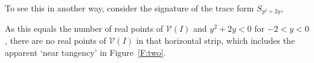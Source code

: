 \documentclass[12pt]{amsart}
\theoremstyle{definition}
\newcommand{\calV}{\mathcal{V}}
\begin{document}
To see this in another way, consider the signature of the trace form $S_{y^2+2y}$,
%
\begin{leftbar}

\end{leftbar}
%
\noindent As this equals the number of real points of $\calV(I)$ and $y^2+2y<0$ for $-2<y<0$, there are no real points of
$\calV(I)$ in that horizontal strip, which includes the apparent `near tangency' in Figure~\ref{F:two}.





%

\end{document}
